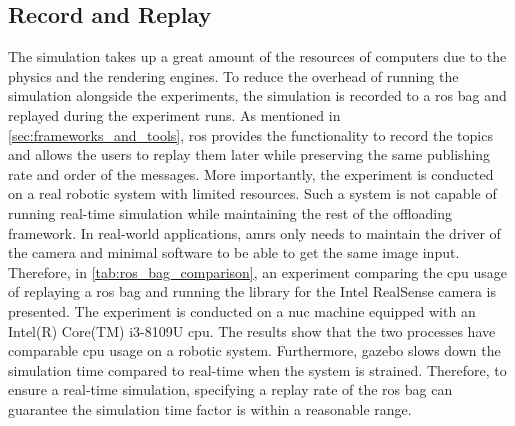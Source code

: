 
\subsection{Record and Replay}

The simulation takes up a great amount of the resources of computers due to the physics and the rendering engines. To reduce the overhead of running the simulation alongside the experiments, the simulation is recorded to a \gls{ros} bag and replayed during the experiment runs. As mentioned in \cref{sec:frameworks_and_tools}, \gls{ros} provides the functionality to record the topics and allows the users to replay them later while preserving the same publishing rate and order of the messages. More importantly, the experiment is conducted on a real robotic system with limited resources. Such a system is not capable of running real-time simulation while maintaining the rest of the offloading framework. In real-world applications, \glspl{amr} only needs to maintain the driver of the camera and minimal software to be able to get the same image input. Therefore, in \cref{tab:ros_bag_comparison}, an experiment comparing the \gls{cpu} usage of replaying a \gls{ros} bag and running the library for the Intel RealSense camera is presented. The experiment is conducted on a \gls{nuc} machine equipped with an Intel(R) Core(TM) i3-8109U \gls{cpu}. The results show that the two processes have comparable \gls{cpu} usage on a robotic system. Furthermore, \gls{gazebo} slows down the simulation time compared to real-time when the system is strained. Therefore, to ensure a real-time simulation, specifying a replay rate of the \gls{ros} bag can guarantee the simulation time factor is within a reasonable range. 

